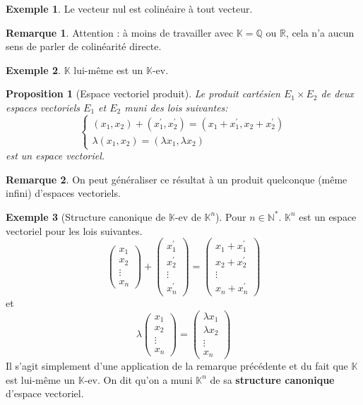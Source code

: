 \documentclass[french]{book}
\newcommand{\Q}{\mathbb{Q}}
\newcommand{\R}{\mathbb{R}}
\newcommand{\K}{\mathbb{K}}
\theoremstyle{plain}
\newtheorem{prop}{Proposition}[chapter]
\theoremstyle{definition}
\newtheorem{exa}{Exemple}[chapter]
\newtheorem{rmq}{Remarque}[chapter]
\theoremstyle{remark}
\begin{document}
\begin{exa}
	Le vecteur nul est colinéaire à tout vecteur.
\end{exa}
\begin{rmq}
	Attention : à moins de travailler avec $\K=\Q$ ou $\R$, cela n'a aucun sens de parler de colinéarité directe.
\end{rmq}
\begin{exa}
	$\K$ lui-même est un $\K$-ev.
\end{exa}
\begin{prop}[Espace vectoriel produit]
	Le produit cartésien \(E_{1}\times E_{2}\) de deux espaces vectoriels $E_{1}$ et $E_{2}$ muni des lois suivantes:
	$$\begin{cases}(x_{1},x_{2})+(x_{1}^{\prime},x_{2}^{\prime})=(x_{1}+x_{1}^{\prime},x_{2}+x_{2}^{\prime})\\ \lambda(x_{1},x_{2})=(\lambda x_{1},\lambda x_{2})\end{cases}$$
est un espace vectoriel.
\end{prop}
\begin{rmq}
	On peut généraliser ce résultat à un produit quelconque (même infini) d'espaces vectoriels.
\end{rmq}
\begin{exa}[Structure canonique de $\K$-ev de $\K^n$]
	Pour $n\in\mathbb{N}^{*}$. $\mathbb{K}^{n}$ est un espace vectoriel pour les lois suivantes.
$$\left(\begin{matrix}x_{1}\\ x_{2}\\ \vdots\\ x_{n}\end{matrix}\right)+\left(\begin{matrix}x_{1}^{\prime}\\ x_{2}^{\prime}\\ \vdots\\ x_{n}^{\prime}\end{matrix}\right)=\left(\begin{matrix}x_{1}+x_{1}^{\prime}\\ x_{2}+x_{2}^{\prime}\\ \vdots\\ x_{n}+x_{n}^{\prime}\end{matrix}\right)$$ et $$\lambda\left(\begin{matrix}x_{1}\\ x_{2}\\ \vdots\\ x_{n}\end{matrix}\right)=\left(\begin{matrix}\lambda x_{1}\\ \lambda x_{2}\\ \vdots\\ x_{n}\end{matrix}\right)$$
Il s'agit simplement d'une application de la remarque précédente et du fait que $\K$ est lui-même un $\K$-ev. On dit qu'on a muni $\mathbb{K}^{n}$ de sa \textbf{structure canonique} d'espace vectoriel.
\end{exa}
\end{document}
